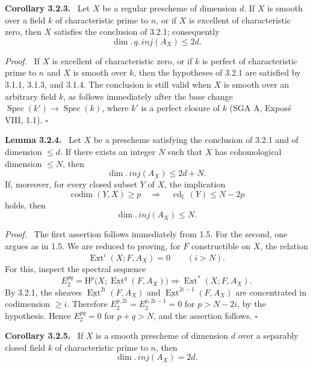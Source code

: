 \documentclass[11pt]{article}
\DeclareMathOperator{\codim}{codim}
\providecommand{\Hh}{\mathrm{H}}
\providecommand{\uExt}{\underline{\Ext}}
\providecommand{\qedtext}{\hfill$\square$}
\newenvironment{statement}[1]{\par\medskip\noindent\textbf{#1.}\ }{\par\medskip}
\newenvironment{prooftext}[1][Proof]{\par\noindent\emph{#1.}\ }{\par\medskip}
\DeclareMathOperator{\Ext}{Ext}
\DeclareMathOperator{\Spec}{Spec}
\DeclareMathOperator{\cd}{cd}
\providecommand{\Spec}{\operatorname{Spec}}
\providecommand{\Spec}{\operatorname{Spec}}
\providecommand{\Spec}{\operatorname{Spec}}
\providecommand{\qedtext}{\hfill$\square$}
\providecommand{\Spec}{\operatorname{Spec}}
\begin{document}
\begin{statement}{Corollary 3.2.3}
Let $X$ be a regular prescheme of dimension $d$. If $X$ is smooth over a field $k$ of characteristic prime to $n$, or if $X$ is excellent of characteristic zero, then $X$ satisfies the conclusion of 3.2.1; consequently
\[
   \dim.\,q.\,inj(A_X)\le 2d.
\]
\end{statement}

\begin{prooftext}
If $X$ is excellent of characteristic zero, or if $k$ is perfect of characteristic prime to $n$ and $X$ is smooth over $k$, then the hypotheses of 3.2.1 are satisfied by 3.1.1, 3.1.3, and 3.1.4. The conclusion is still valid when $X$ is smooth over an arbitrary field $k$, as follows immediately after the base change $\Spec(k')\to\Spec(k)$, where $k'$ is a perfect closure of $k$ (SGA A, Exposé VIII, 1.1). \qedtext
\end{prooftext}

\begin{statement}{Lemma 3.2.4}
Let $X$ be a prescheme satisfying the conclusion of 3.2.1 and of dimension $\le d$. If there exists an integer $N$ such that $X$ has cohomological dimension $\le N$, then
\[
   \dim.\,inj(A_X)\le 2d+N.
\]
If, moreover, for every closed subset $Y$ of $X$, the implication
\[
   \codim(Y,X)\ge p \quad\Rightarrow\quad \cd_{\mathbb{L}}(Y)\le N-2p
\]
holds, then
\[
   \dim.\,inj(A_X)\le N.
\]
\end{statement}

\begin{prooftext}
The first assertion follows immediately from 1.5. For the second, one argues as in 1.5. We are reduced to proving, for $F$ constructible on $X$, the relation
\[
   \Ext^i(X;F,A_X)=0\qquad(i>N).
\]
For this, inspect the spectral sequence
\[
   E_2^{pq}=\Hh^p\bigl(X;\uExt^q(F,A_X)\bigr)
      \Rightarrow \Ext^*(X;F,A_X).
\]
By 3.2.1, the sheaves $\uExt^{2i}(F,A_X)$ and $\uExt^{2i-1}(F,A_X)$ are concentrated in codimension $\ge i$. Therefore $E_2^{p,2i}=E_2^{p,2i-1}=0$ for $p>N-2i$, by the hypothesis. Hence $E_2^{pq}=0$ for $p+q>N$, and the assertion follows. \qedtext
\end{prooftext}

\begin{statement}{Corollary 3.2.5}
If $X$ is a smooth prescheme of dimension $d$ over a separably closed field $k$ of characteristic prime to $n$, then
\[
   \dim.\,inj(A_X)=2d.
\]
\end{statement}
\end{document}
